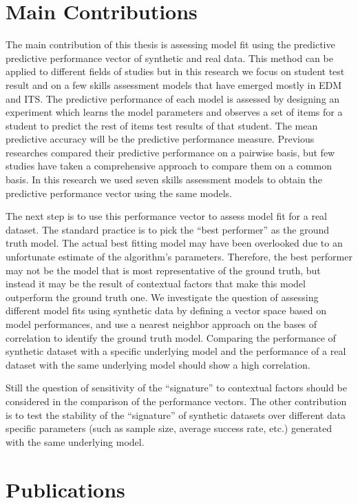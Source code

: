 \section{Main Contributions}

The main contribution of this thesis is assessing model fit using the predictive predictive performance vector of synthetic and real data. This method can be applied to different fields of studies but in this research we focus on student test result and on a few skills assessment models that have emerged mostly in EDM and ITS. The predictive performance of each model is assessed by designing an experiment which learns the model parameters and observes a set of items for a student to predict the rest of items test results of that student. The mean predictive accuracy will be the predictive performance measure. Previous researches compared their predictive performance  on a pairwise basis, but few studies have taken a comprehensive approach to compare them on a common basis. In this research we used seven skills assessment models to obtain the predictive performance vector using the same models. 

The next step is to use this performance vector to assess model fit for a real dataset. The standard practice is to pick the ``best performer'' as the ground truth model. The actual best fitting model may have been overlooked due to an unfortunate estimate of the algorithm's parameters.  Therefore, the best performer may not be the model that is most representative of the ground truth, but instead it may be the result of contextual factors that make this model outperform the ground truth one. We investigate the question of assessing different model fits using synthetic data by defining a vector space based on model performances, and use a nearest neighbor approach on the bases of correlation to identify the ground truth model. Comparing the performance of synthetic dataset with a specific underlying model and the performance of a real dataset with the same underlying model should show a high correlation. 

Still the question of sensitivity of the ``signature'' to contextual factors should be considered in the comparison of the performance vectors. The other contribution is to test the stability of the ``signature'' of synthetic datasets over different data specific parameters (such as sample size, average success rate, etc.) generated with the same underlying model. 


\section{Publications}

